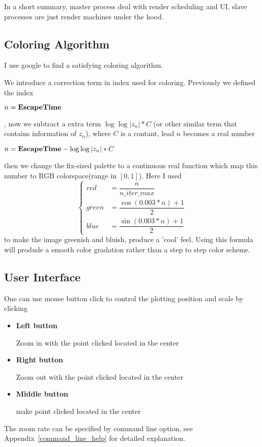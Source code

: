 \documentclass{article}
\newcommand{\centerize}[1]{\begin{center} #1 \end{center}}
\begin{document}
		In a short summary, master process deal with render scheduling and UI,
		slave processes are just render machines under the hood.

	\subsection{Coloring Algorithm}

		I use google to find a satisfying coloring algorithm.

		We introduce a correction term in index used for coloring. Previously
		we defined the index

		\centerize{$n = {\bf Escape Time}$}, now we subtract
		a extra term $\log{\log{|z_n|}} * C$ (or other similar term that contains
		information of $z_n$), where $C$ is a contant, lead $n$ becomes a real number
		\centerize{$n = {\bf Escape Time} - \log{\log{|z_n|}} * C$} then we change
		the fix-sized palette to a continuous real function which map this number
		to RGB colorspace(range in $[0,1]$). Here I used
			$$
				\left \{
					\begin{aligned}
						red &= \dfrac{n}{n\_iter\_max} \\
						green &= \dfrac{\cos(0.003 * n) + 1}{2} \\
						blue &= \dfrac{\sin(0.003 * n) + 1}{2}
					\end{aligned}
				\right .
			$$
		to make the image greenish and bluish, produce a 'cool' feel.
		Using this formula will produde a smooth color gradation rather
		than a step to step color scheme.

		\begin{figure}[!ht]
			\centering
		\end{figure}

	\subsection{User Interface}
		One can use mouse button click to control the plotting position and scale by clicking
		\begin{itemize}
			\item {\bf Left button}

				Zoom in with the point clicked located in the center
			\item {\bf Right button}

				Zoom out with the point clicked located in the center
			\item {\bf Middle button}

				make point clicked located in the center
		\end{itemize}
		The zoom rate can be specified by command line option, see
		Appendix~\ref{command_line_help} for detailed explanation.
\end{document}
